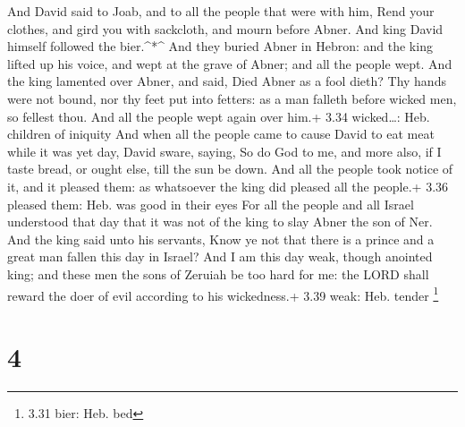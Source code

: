  And David said to Joab, and to all the people that were
with him, Rend your clothes, and gird you with sackcloth, and mourn
before Abner. And king David himself followed the bier.\^{}*\^{}
 And they buried Abner in Hebron: and the king lifted up
his voice, and wept at the grave of Abner; and all the people wept.
 And the king lamented over Abner, and said, Died Abner as
a fool dieth?  Thy hands were not bound, nor thy feet put
into fetters: as a man falleth before wicked men, so fellest thou. And
all the people wept again over him.+ 3.34 wicked\ldots: Heb. children of
iniquity  And when all the people came to cause David to
eat meat while it was yet day, David sware, saying, So do God to me, and
more also, if I taste bread, or ought else, till the sun be down.
 And all the people took notice of it, and it pleased them:
as whatsoever the king did pleased all the people.+ 3.36 pleased them:
Heb. was good in their eyes  For all the people and all
Israel understood that day that it was not of the king to slay Abner the
son of Ner.  And the king said unto his servants, Know ye
not that there is a prince and a great man fallen this day in Israel?
 And I am this day weak, though anointed king; and these
men the sons of Zeruiah be too hard for me: the LORD shall reward the
doer of evil according to his wickedness.+ 3.39 weak: Heb. tender
\footnote{3.31 bier: Heb. bed}

\hypertarget{section-3}{%
\section{4}\label{section-3}}

